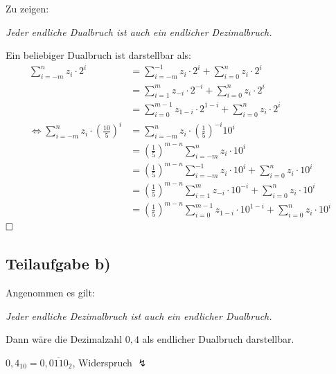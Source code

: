 \documentclass{llncs}
\begin{document}
Zu zeigen: 
\begin{center}
\textit{Jeder endliche Dualbruch ist auch ein endlicher Dezimalbruch.}
\end{center}
Ein beliebiger Dualbruch ist darstellbar als:
\begin{align*}
\sum_{i=-m}^{n} z_{i} \cdot 2^{i} &= \sum_{i=-m}^{-1} z_{i} \cdot 2^{i} + \sum_{i=0}^{n} z_{i} \cdot 2^{i} \\
                                  &= \sum_{i=1}^{m} z_{-i} \cdot 2^{-i} + \sum_{i=0}^{n} z_{i} \cdot 2^{i} \\
                                  &= \sum_{i=0}^{m-1} z_{1-i} \cdot 2^{1-i} + \sum_{i=0}^{n} z_{i} \cdot 2^{i}\\
\Leftrightarrow \sum_{i=-m}^{n} z_{i} \cdot \left( \frac{10}{5} \right)^{i} &= \sum_{i=-m}^{n} z_{i} \cdot \left(\frac{1}{5}\right)^{-i} 10^{i} \\
                                  &= \left(\frac{1}{5}\right)^{m-n} \sum_{i=-m}^{n} z_{i} \cdot 10^{i} \\
                                  &= \left(\frac{1}{5}\right)^{m-n} \sum_{i=-m}^{-1} z_{i} \cdot 10^{i} + \sum_{i=0}^{n} z_{i} \cdot 10^{i} \\
                                  &= \left(\frac{1}{5}\right)^{m-n} \sum_{i=1}^{m} z_{-i} \cdot 10^{-i} + \sum_{i=0}^{n} z_{i} \cdot 10^{i} \\
                                  &= \left(\frac{1}{5}\right)^{m-n} \sum_{i=0}^{m-1} z_{1-i} \cdot 10^{1-i} + \sum_{i=0}^{n} z_{i} \cdot 10^{i}
\end{align*}
$\hfill \square$



\subsection*{Teilaufgabe b)}

Angenommen es gilt:
\begin{center}
\textit{Jeder endliche Dezimalbruch ist auch ein endlicher Dualbruch.}
\end{center}
Dann w\"are die Dezimalzahl $0,4$ als endlicher Dualbruch darstellbar.
\begin{center}
$0,4_{10} = 0,\overline{0110}_2$, Widerspruch $\lightning$
\end{center}
\end{document}
